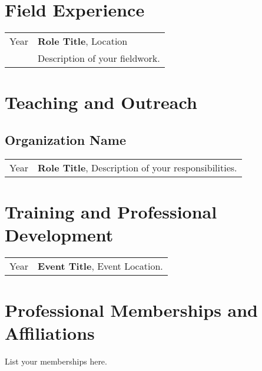 \documentclass[a4paper,10pt]{article}
\begin{document}
\section*{Field Experience}
\begin{tabularx}{\textwidth}{>{\raggedright\arraybackslash}p{1cm} X}
Year & \textbf{Role Title}, Location \\
     & Description of your fieldwork.
\end{tabularx}

\section*{Teaching and Outreach}
\subsection*{Organization Name}
\begin{tabularx}{\textwidth}{>{\raggedright\arraybackslash}p{2.5cm} X}
Year & \textbf{Role Title}, Description of your responsibilities.
\end{tabularx}

\section*{Training and Professional Development}
\begin{tabularx}{\textwidth}{>{\raggedright\arraybackslash}p{1cm} X}
Year & \textbf{Event Title}, Event Location.
\end{tabularx}

\section*{Professional Memberships and Affiliations}
List your memberships here.
\end{document}
